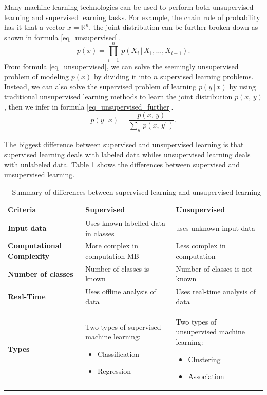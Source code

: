 \documentclass[master]{thesis-uestc}
\begin{document}
Many machine learning technologies can be used to perform both unsupervised learning and supervised learning tasks. For example, the chain rule of probability has it that a vector $x = \mathbb{R}^n$, the joint distribution can be further broken down as shown in formula \ref{eq_unsupervised}.
\begin{equation}
    p(x) = {\displaystyle \prod_{i=1}^{n}}\,p(X_i\,|\,X_1,\dots,X_{i-1}).
    \label{eq_unsupervised}
\end{equation}
From formula \ref{eq_unsupervised}, we can solve the seemingly unsupervised problem of modeling $p(x)$ by dividing it into $n$ supervised learning problems. Instead, we can also solve the supervised problem of learning $p(y\,|\,x)$ by using traditional unsupervised learning methods to learn the joint distribution $p(x,\,y)$, then we infer in formula \ref{eq_unsupervised_further}.
\begin{equation}
    p(y\,|\,x) = \frac{p(x,\,y)}{\sum_y\,p(x,\,y^1)}.
\label{eq_unsupervised_further}
\end{equation}

The biggest difference between supervised and unsupervised learning is that supervised learning deals with labeled data whiles unsupervised learning deals with unlabeled data. Table \ref{diff_supervised_unsupervised} shows the differences between supervised and unsupervised learning.

\begin{center}
\begin{table}
\caption{\,\,\,\,\,Summary of differences between supervised learning and unsupervised learning}
\begin{tabular}{ | m{10em} | m{5cm}| m{5cm} | } 
\hline
\textbf{Criteria} & \textbf{Supervised} & \textbf{Unsupervised} \\ 
\hline
\textbf{Input data} & Uses known labelled data in classes & uses unknown input data  \\ 
\hline
\textbf{Computational Complexity} & More complex in computation MB & Less complex in computation \\ 
\hline
\textbf{Number of classes} & Number of classes is known & Number of classes is not known \\
\hline
\textbf{Real-Time} & Uses offline analysis of data & Uses real-time analysis of data \\
\hline
\textbf{Types} & Two types of supervised machine learning:
\begin{itemize}
    \item Classification
    \item Regression
\end{itemize}& Two types of unsupervised machine learning:
\begin{itemize}
    \item Clustering
    \item Association
\end{itemize}\\
\hline
\end{tabular}
\label{diff_supervised_unsupervised}
\end{table}
\end{center}
\end{document}
